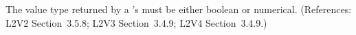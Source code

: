 The value type returned by a \FunctionDefinition's  must be
either boolean or numerical.  (References: L2V2 Section~3.5.8;
L2V3 Section~3.4.9; L2V4 Section~3.4.9.)
